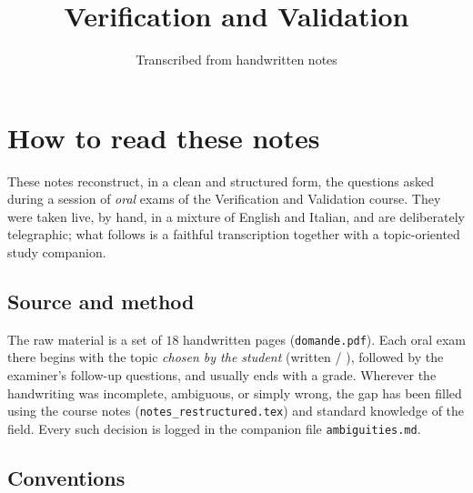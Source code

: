 \documentclass[oneside]{academica}
\title{Verification and Validation}
\author{Transcribed from handwritten notes}
\begin{document}
\frontmatter

\maketitle

\tableofcontents

\mainmatter

\chapter{How to read these notes}

These notes reconstruct, in a clean and structured form, the questions
asked during a session of \emph{oral} exams of the Verification and
Validation course. They were taken live, by hand, in a mixture of
English and Italian, and are deliberately telegraphic; what follows is a
faithful transcription together with a topic-oriented study companion.

\section*{Source and method}

The raw material is a set of $18$ handwritten pages
(\texttt{domande.pdf}). Each oral exam there begins with the topic
\emph{chosen by the student} (written  / ), followed by the examiner's follow-up questions, and usually
ends with a grade. Wherever the handwriting was incomplete, ambiguous,
or simply wrong, the gap has been filled using the course notes
(\texttt{notes\_restructured.tex}) and standard knowledge of the field.
Every such decision is logged in the companion file
\texttt{ambiguities.md}.

\section*{Conventions}
\end{document}
